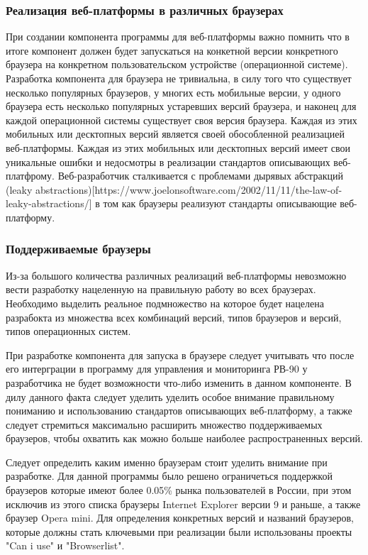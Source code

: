 \subsubsection{ Реализация веб-платформы в различных браузерах}
При создании компонента программы для веб-платформы важно помнить что в итоге компонент должен будет запускаться на конкетной версии конкретного браузера на конкретном пользовательском устройстве (операционной системе).
Разработка компонента для браузера не тривиальна, в силу того что существует несколько популярных браузеров, у многих есть мобильные версии, у одного браузера есть несколько популярных устаревших версий браузера, и наконец для каждой операционной системы существует своя версия браузера. Каждая из этих мобильных или десктопных версий является своей обособленной реализацией веб-платформы. Каждая из этих мобильных или десктопных версий имеет свои уникальные ошибки и недосмотры в реализации стандартов описывающих веб-платфрому. Веб-разработчик сталкивается с проблемами дырявых абстракций (leaky abstractions)[https://www.joelonsoftware.com/2002/11/11/the-law-of-leaky-abstractions/] в том как браузеры реализуют стандарты описывающие веб-платформу.


\subsubsection{ Поддерживаемые браузеры}
Из-за большого количества различных реализаций веб-платформы невозможно вести разработку нацеленную на правильную работу во всех браузерах. Необходимо выделить реальное подмножество на которое будет нацелена разрабокта из множества всех комбинаций версий, типов браузеров и версий, типов операционных систем.

При разработке компонента для запуска в браузере следует учитывать что после его интерграции в программу для управления и мониторинга РВ-90 у разработчика не будет возможности что-либо изменить в данном компоненте. В дилу данного факта следует уделить уделить особое внимание правильному пониманию и использованию стандартов описывающих веб-платформу, а также следует стремиться максимально расширить множество поддерживаемых браузеров, чтобы охватить как можно больше наиболее распространенных версий.

Следует определить каким именно браузерам стоит уделить внимание при разработке. 
Для данной программы было решено ограничеться поддержкой браузеров которые имеют более 0.05\% рынка пользователей в России, при этом исключив из этого списка браузеры Internet Explorer версии 9 и раньше, а также браузер Opera mini. Для определения конкретных версий и названий браузеров, которые должны стать ключевыми при реализации были использованы проекты "Can i use" и "Browserlist".


